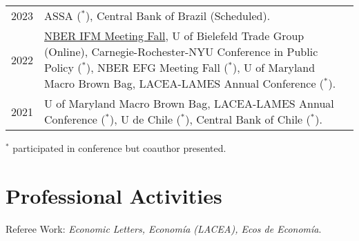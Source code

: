 \documentclass[11pt]{article}
\begin{document}
\noindent
\begin{tabular}{@{}lp{15.5cm}}
2023& ASSA ($^\ast$), Central Bank of Brazil (Scheduled).\\
2022& \underline{NBER IFM Meeting Fall}, U of Bielefeld Trade Group (Online), Carnegie-Rochester-NYU Conference in Public Policy ($^\ast$), NBER EFG Meeting Fall ($^\ast$), U of Maryland Macro Brown Bag, LACEA-LAMES Annual Conference ($^\ast$).\\
2021& U of Maryland Macro Brown Bag, LACEA-LAMES Annual Conference ($^\ast$), U de Chile ($^\ast$), Central Bank of Chile ($^\ast$).
\end{tabular}

{\footnotesize $^\ast$ participated in conference but coauthor presented.}








\section*{Professional Activities}
Referee Work:  \emph{Economic Letters, Econom\'ia (LACEA), Ecos de Econom\'ia}.

%
%
%
\end{document}
